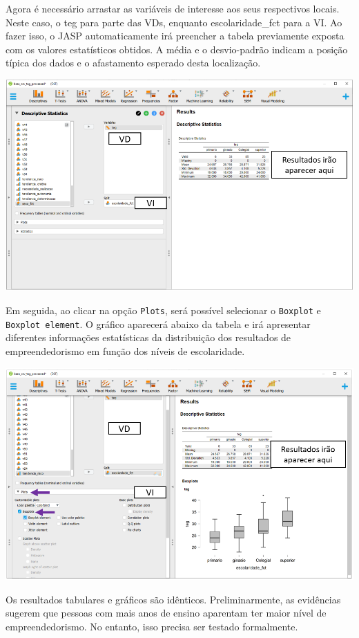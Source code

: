 \documentclass[
]{book}
\begin{document}
Agora é necessário arrastar as variáveis de interesse aos seus respectivos locais. Neste caso, o teg para parte das VDs, enquanto escolaridade\_fct para a VI. Ao fazer isso, o JASP automaticamente irá preencher a tabela previamente exposta com os valores estatísticos obtidos. A média e o desvio-padrão indicam a posição típica dos dados e o afastamento esperado desta localização.

\includegraphics{./img/cap_anova_descritivo.png}

Em seguida, ao clicar na opção \texttt{Plots}, será possível selecionar o \texttt{Boxplot} e \texttt{Boxplot\ element}. O gráfico aparecerá abaixo da tabela e irá apresentar diferentes informações estatísticas da distribuição dos resultados de empreendedorismo em função dos níveis de escolaridade.

\includegraphics{./img/cap_anova_descritivo2.png}

Os resultados tabulares e gráficos são idênticos. Preliminarmente, as evidências sugerem que pessoas com mais anos de ensino aparentam ter maior nível de empreendedorismo. No entanto, isso precisa ser testado formalmente.
\end{document}
